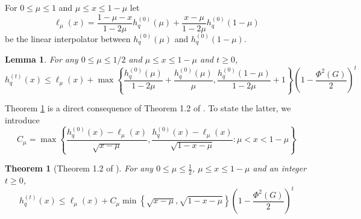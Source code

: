 \documentclass[11pt,twoside]{article}
\newtheorem{theorem}{Theorem}
\newtheorem{lemma}{Lemma}
\newcommand{\set}[1]{\left\{#1\right\}}
\newcommand{\1}{\mathbf{1}}
\begin{document}
For $0 \leq \mu \leq 1$ and $\mu \leq x \leq 1 - \mu$ let 
\begin{equation*}
\ell_{\mu}(x) = \frac{1 - \mu - x}{1 - 2\mu} h_q^{(0)}(\mu) + \frac{x - \mu}{1 - 2\mu}h_q^{(0)}(1 - \mu)
\end{equation*}
be the linear interpolator between $h_q^{(0)}(\mu)$ and $h_q^{(0)}(1 - \mu)$. 

\begin{lemma}
	\label{lem: lt_ub}
	For any $0 \leq \mu \leq 1/2$ and $\mu \leq x \leq 1 - \mu$ and $t \geq 0$, 
	\begin{equation*}
	h_q^{(t)}(x) \leq \ell_{\mu}(x) + \max \set{\frac{h_q^{(0)}(\mu)}{1 - 2\mu} + \frac{h_q^{(0)}(\mu)}{\mu} , \frac{h_q^{(0)}(1 - \mu) }{1 - 2\mu} + 1 }\left(1 - \frac{\Phi^2(G)}{2}\right)^t
	\end{equation*}
\end{lemma}

Theorem \ref{lem: lt_ub} is a direct consequence of Theorem 1.2 of \cite{lovasz1990}. To state the latter, we introduce
\begin{equation*}
C_{\mu} = \max \set{\frac{h_q^{(0)}(x) - \ell_{\mu}(x)}{\sqrt{x - \mu}}, \frac{h_q^{(0)}(x) - \ell_{\mu}(x)}{\sqrt{1 - x - \mu}}: \mu < x < 1 - \mu}
\end{equation*}
\begin{theorem}[Theorem 1.2 of \cite{lovasz1990}]
	\label{thm: lovasz_simonovits_1993}
	For any $0 \leq \mu \leq \frac{1}{2}$, $\mu \leq x \leq 1 - \mu$ and an integer $t \geq 0$,
	\begin{equation*}
	h_q^{(t)}(x) \leq \ell_{\mu}(x) + C_{\mu} \min \set{\sqrt{x - \mu}, \sqrt{1 - x - \mu}} \left(1 - \frac{\Phi^2(G)}{2}\right)^t
	\end{equation*}
\end{theorem}
\end{document}
